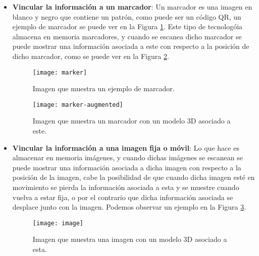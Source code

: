 \begin{itemize}
  \item \textbf{Vincular la información a un marcador}: Un marcador es una imagen en blanco y negro que contiene un patrón, como puede ser un código QR, un ejemplo de marcador se puede ver en la Figura \ref{figura-marcador}. Este tipo de tecnologóia almacena en memoria marcadores, y cuando se escanea dicho marcador se puede mostrar una información asociada a este con respecto a la posición de dicho marcador, como se puede ver en la Figura \ref{figura-marcador-aumentado}.

  \begin{figure}
    \centering
    \texttt{[image: marker]}
    \caption{Imagen que muestra un ejemplo de marcador.}
    \label{figura-marcador}
  \end{figure}

  \begin{figure}[h]
    \centering
    \texttt{[image: marker-augmented]}
    \caption{Imagen que muestra un marcador con un modelo 3D asociado a este.\protect\footnotemark}
    \label{figura-marcador-aumentado}
  \end{figure}


  \newpage

  \item \textbf{Vincular la información a una imagen fija o móvil}: Lo que hace es almacenar en memoria imágenes, y cuando dichas imágenes se escanean se puede mostrar una información asociada a dicha imagen con respecto a la posición de la imagen, cabe la posibilidad de que cuando dicha imagen esté en movimiento se pierda la información asociada a esta y se muestre cuando vuelva a estar fija, o por el contrario que dicha información asociada se desplace junto con la imagen. Podemos observar un ejemplo en la Figura \ref{figura-image}.

  \begin{figure}[h]
    \centering
    \texttt{[image: image]}
    \caption{Imagen que muestra una imagen con un modelo 3D asociado a esta.\protect\footnotemark}
    \label{figura-image}
  \end{figure}


  \newpage


\end{itemize}
